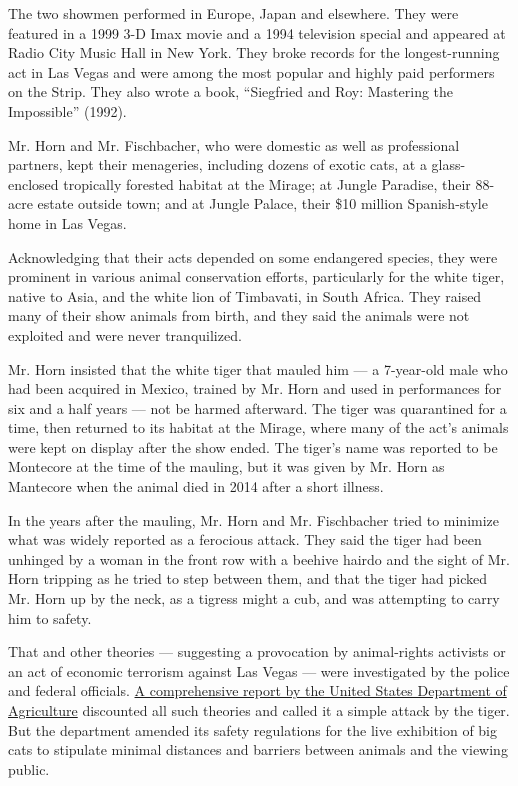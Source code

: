The two showmen performed in Europe, Japan and elsewhere. They were
featured in a 1999 3-D Imax movie and a 1994 television special and
appeared at Radio City Music Hall in New York. They broke records for
the longest-running act in Las Vegas and were among the most popular and
highly paid performers on the Strip. They also wrote a book, ``Siegfried
and Roy: Mastering the Impossible'' (1992).

Mr. Horn and Mr. Fischbacher, who were domestic as well as professional
partners, kept their menageries, including dozens of exotic cats, at a
glass-enclosed tropically forested habitat at the Mirage; at Jungle
Paradise, their 88-acre estate outside town; and at Jungle Palace, their
\$10 million Spanish-style home in Las Vegas.

Acknowledging that their acts depended on some endangered species, they
were prominent in various animal conservation efforts, particularly for
the white tiger, native to Asia, and the white lion of Timbavati, in
South Africa. They raised many of their show animals from birth, and
they said the animals were not exploited and were never tranquilized.

Mr. Horn insisted that the white tiger that mauled him --- a 7-year-old
male who had been acquired in Mexico, trained by Mr. Horn and used in
performances for six and a half years --- not be harmed afterward. The
tiger was quarantined for a time, then returned to its habitat at the
Mirage, where many of the act's animals were kept on display after the
show ended. The tiger's name was reported to be Montecore at the time of
the mauling, but it was given by Mr. Horn as Mantecore when the animal
died in 2014 after a short illness.

In the years after the mauling, Mr. Horn and Mr. Fischbacher tried to
minimize what was widely reported as a ferocious attack. They said the
tiger had been unhinged by a woman in the front row with a beehive
hairdo and the sight of Mr. Horn tripping as he tried to step between
them, and that the tiger had picked Mr. Horn up by the neck, as a
tigress might a cub, and was attempting to carry him to safety.

That and other theories --- suggesting a provocation by animal-rights
activists or an act of economic terrorism against Las Vegas --- were
investigated by the police and federal officials.
\href{https://www.cbsnews.com/news/roy-horn-tiger-mauling-case-closed/}{A
comprehensive report by the United States Department of Agriculture}
discounted all such theories and called it a simple attack by the tiger.
But the department amended its safety regulations for the live
exhibition of big cats to stipulate minimal distances and barriers
between animals and the viewing public.

